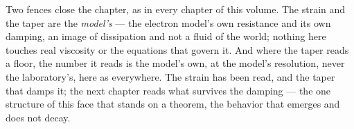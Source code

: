 Two fences close the chapter, as in every chapter of this volume. The strain and
the taper are the \emph{model's} --- the electron model's own resistance and its
own damping, an image of dissipation and not a fluid of the world; nothing here
touches real viscosity or the equations that govern it. And where the taper reads
a floor, the number it reads is the model's own, at the model's resolution, never
the laboratory's, here as everywhere. The strain has been read, and the taper
that damps it; the next chapter reads what survives the damping --- the one
structure of this face that stands on a theorem, the behavior that emerges and
does not decay.
